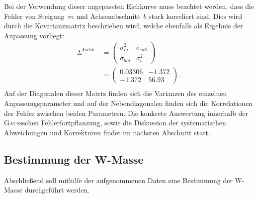 \documentclass[11pt, a4paper]{article}
\numberwithin{equation}{section}
\begin{document}
Bei der Verwendung dieser angepassten Eichkurve muss beachtet werden, dass die Fehler von Steigung~$m$ und Achsenabschnitt~$b$ stark korreliert sind.
Dies wird durch die Kovarianzmatrix beschrieben wird, welche ebenfalls als Ergebnis der Anpassung vorliegt:
\begin{align*}
			\Sigma^\mathrm{Eichk.} &= \begin{pmatrix}
			\sigma_m^2 & \sigma_{mb} \\
			\sigma_{bm} & \sigma_b^2
			\end{pmatrix}\\
			&= \begin{pmatrix}
			\num{0.03306} & \num{-1.372} \\
			\num{-1.372}    & \num{56.93}
			\end{pmatrix} \, \text{.}\\
\end{align*}
Auf der Diagonalen dieser Matrix finden sich die Varianzen der einzelnen Anpassungsparameter und auf der Nebendiagonalen finden sich die Korrelationen der Fehler zwischen beiden Parametern.
Die konkrete Auswertung innerhalb der \textsc{Gauß}schen Fehlerfortpflanzung, sowie die Diskussion der systematischen Abweichungen und Korrekturen findet im nächsten Abschnitt statt.

\subsection{Bestimmung der W-Masse}
Abschließend soll mithilfe der aufgenommenen Daten eine Bestimmung der W-Masse durchgeführt werden.
\end{document}
